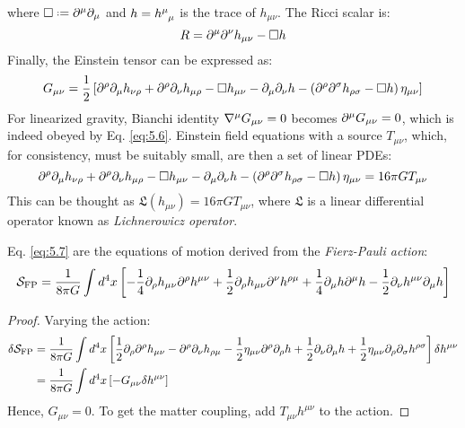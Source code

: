 where $ \Box \defeq \pa^\mu \pa_\mu $ and $ h = \tensor{h}{^\mu_\mu} $ is the trace of $ h_{\mu \nu} $. The Ricci scalar is:
\begin{equation}
  R = \partial^\mu \partial^\nu h_{\mu \nu} - \Box h
  \label{eq:5.5}
\end{equation}
Finally, the Einstein tensor can be expressed as:
\begin{equation}
  G_{\mu \nu} = \frac{1}{2} \left[ \partial^\rho \partial_\mu h_{\nu \rho} + \partial^\rho \partial_\nu h_{\mu \rho} - \Box h_{\mu \nu} - \partial_\mu \partial_\nu h - \left( \partial^\rho \partial^\sigma h_{\rho \sigma} - \Box h \right) \eta_{\mu \nu} \right]
  \label{eq:5.6}
\end{equation}
For linearized gravity, Bianchi identity $ \nabla^\mu G_{\mu \nu} = 0 $ becomes $ \partial^\mu G_{\mu \nu} = 0 $, which is indeed obeyed by Eq. \ref{eq:5.6}. Einstein field equations with a source $ T_{\mu \nu} $, which, for consistency, must be suitably small, are then a set of linear PDEs:
\begin{equation}
  \partial^\rho \partial_\mu h_{\nu \rho} + \partial^\rho \partial_\nu h_{\mu \rho} - \Box h_{\mu \nu} - \partial_\mu \partial_\nu h - \left( \partial^\rho \partial^\sigma h_{\rho \sigma} - \Box h \right) \eta_{\mu \nu} = 16\pi G T_{\mu \nu}
  \label{eq:5.7}
\end{equation}
This can be thought as $ \mathfrak{L}(h_{\mu \nu}) = 16\pi G T_{\mu \nu} $, where $ \mathfrak{L} $ is a linear differential operator known as \textit{Lichnerowicz operator}.

\begin{proposition}
  Eq. \ref{eq:5.7} are the equations of motion derived from the \textit{Fierz-Pauli action}:
  \begin{equation}
    \mathcal{S}_{\text{FP}} = \frac{1}{8\pi G} \int d^4 x \left[ - \frac{1}{4} \partial_\rho h_{\mu \nu} \partial^\rho h^{\mu \nu} + \frac{1}{2} \partial_\rho h_{\mu \nu} \partial^\nu h^{\rho \mu} + \frac{1}{4} \partial_\mu h \partial^\mu h - \frac{1}{2} \partial_\nu h^{\mu \nu} \partial_\mu h \right]
    \label{eq:5.8}
  \end{equation}
\end{proposition}
\begin{proof}
  Varying the action:
  \begin{equation*}
    \begin{split}
      \delta \mathcal{S}_{\text{FP}}
      &= \frac{1}{8\pi G} \int d^4 x \left[ \frac{1}{2} \partial_\rho \partial^\rho h_{\mu \nu} - \partial^\rho \partial_\nu h_{\rho \mu} - \frac{1}{2} \eta_{\mu \nu} \partial^\rho \partial_\rho h + \frac{1}{2} \partial_\nu \partial_\mu h + \frac{1}{2} \eta_{\mu \nu} \partial_\rho \partial_\sigma h^{\rho \sigma} \right] \delta h^{\mu \nu} \\
      &= \frac{1}{8\pi G} \int d^4 x \left[ - G_{\mu \nu} \delta h^{\mu \nu} \right]
    \end{split}
  \end{equation*}
  Hence, $ G_{\mu \nu} = 0 $. To get the matter coupling, add $ T_{\mu \nu} h^{\mu \nu} $ to the action.
\end{proof}

